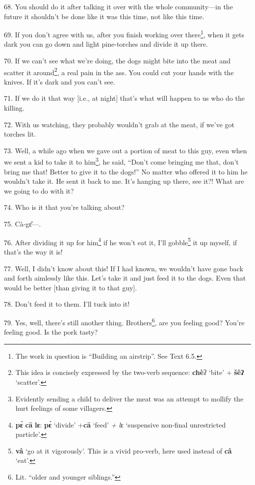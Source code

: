 68. You should do it after talking it over with the whole community---in the future
it shouldn't be done like it was this time, not like this time.

69. If you don't agree with us, after you finish working over there\footnote{The work in question is ``Building an airstrip''. See Text 6.5.}, when
it gets dark you can go down and light pine-torches and divide it up there.

70. If we can't see what we're doing, the dogs might bite into the meat and scatter
it around\footnote{This idea is concisely expressed by the two-verb sequence: \textbf{chè}ʔ `bite' + \textbf{šêʔ} `scatter'.}, a real pain in the ass. You could cut your hands with the knives.
If it's dark and you can't see.

71. If we do it that way [i.e., at night] that's what will happen to us who do
the killing.

72. With us watching, they probably wouldn't grab at the meat, if we've got torches
lit.

73. Well, a while ago when we gave out a portion of meat to this guy, even when
we sent a kid to take it to him\footnote{Evidently sending a child to deliver the meat was an attempt to mollify the hurt feelings of some villagers.}, he said, ``Don't come bringing me that, don't
bring me that! Better to give it to the dogs!'' No matter who offered it to him
he wouldn't take it. He sent it back to me. It's hanging up there, see it?! What
are we going to do with it?

74. Who is it that you're talking about?

75. Cà-gɛ̂---.

76. After dividing it up for him\footnote{\textbf{pɛ̀} \textbf{cā} \textbf{lɛ}: \textbf{pɛ̀} `divide' +\textbf{cā} `feed'\textit{ + l}ɛ `suspensive non-final unrestricted particle'.} if he won't eat it, I'll gobble\footnote{\textbf{vâ} `go at it vigorously'. This is a vivid pro-verb, here used instead of \textbf{câ} `eat'.} it up
myself, if that's the way it is!

77. Well, I didn't know about this! If I had known, we wouldn't have gone back
and forth aimlessly like this. Let's take it and just feed it to the dogs. Even
that would be better [than giving it to that guy].

78. Don't feed it to them. I'll tuck into it!

79. Yes, well, there's still another thing. Brothers\footnote{Lit. ``older and younger siblings.''}, are you feeling good?
You're feeling good. Is the pork tasty?

